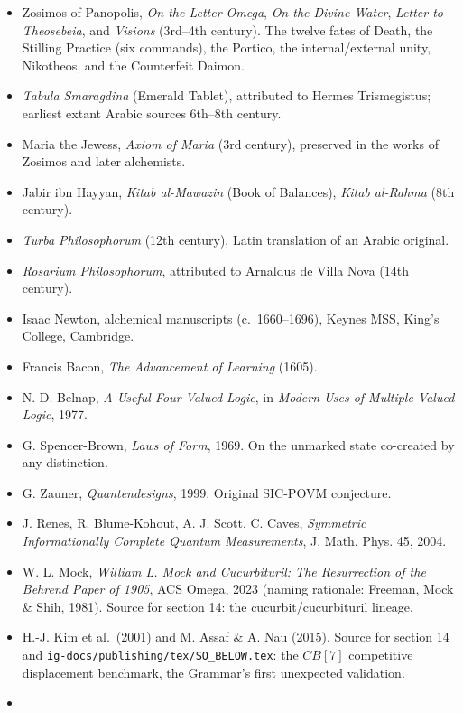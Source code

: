 \begin{itemize}
\tightlist
\item
  Zosimos of Panopolis, \emph{On the Letter Omega}, \emph{On the Divine
  Water}, \emph{Letter to Theosebeia}, and \emph{Visions} (3rd--4th
  century). The twelve fates of Death, the Stilling Practice (six
  commands), the Portico, the internal/external unity, Nikotheos, and
  the Counterfeit Daimon.
\item
  \emph{Tabula Smaragdina} (Emerald Tablet), attributed to Hermes
  Trismegistus; earliest extant Arabic sources 6th--8th century.
\item
  Maria the Jewess, \emph{Axiom of Maria} (3rd century), preserved in
  the works of Zosimos and later alchemists.
\item
  Jabir ibn Hayyan, \emph{Kitab al-Mawazin} (Book of Balances),
  \emph{Kitab al-Rahma} (8th century).
\item
  \emph{Turba Philosophorum} (12th century), Latin translation of an
  Arabic original.
\item
  \emph{Rosarium Philosophorum}, attributed to Arnaldus de Villa Nova
  (14th century).
\item
  Isaac Newton, alchemical manuscripts (c.~1660--1696), Keynes MSS,
  King's College, Cambridge.
\item
  Francis Bacon, \emph{The Advancement of Learning} (1605).
\item
  N. D. Belnap, \emph{A Useful Four-Valued Logic}, in \emph{Modern Uses
  of Multiple-Valued Logic}, 1977.
\item
  G. Spencer-Brown, \emph{Laws of Form}, 1969. On the unmarked state
  co-created by any distinction.
\item
  G. Zauner, \emph{Quantendesigns}, 1999. Original SIC-POVM conjecture.
\item
  J. Renes, R. Blume-Kohout, A. J. Scott, C. Caves, \emph{Symmetric
  Informationally Complete Quantum Measurements}, J. Math. Phys. 45,
  2004.
\item
  W. L. Mock, \emph{William L. Mock and Cucurbituril: The Resurrection
  of the Behrend Paper of 1905}, ACS Omega, 2023 (naming rationale:
  Freeman, Mock \& Shih, 1981). Source for section 14: the
  cucurbit/cucurbituril lineage.
\item
  H.-J. Kim et al.~(2001) and M. Assaf \& A. Nau (2015). Source for
  section 14 and \texttt{ig-docs/publishing/tex/SO\_BELOW.tex}: the
  \({CB[7]}\) competitive displacement benchmark, the Grammar's first
  unexpected validation.
\item

\end{itemize}
